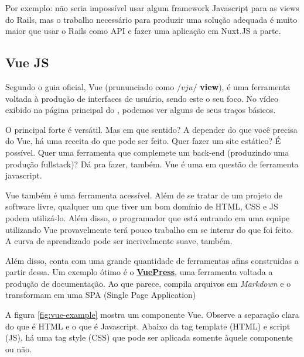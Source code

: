 Por exemplo: não seria impossível usar algum framework Javascript para as views do Rails, mas
o trabalho necessário para produzir uma solução adequada é muito maior que usar o Rails como
API e fazer uma aplicação em Nuxt.JS a parte.

\subsection{Vue JS}\label{subsec:vue-js}

Segundo o guia oficial, Vue (prununciado como $/vju/$ \dir \textbf{view}), é uma ferramenta
voltada à produção de interfaces de usuário, sendo este o seu foco. No vídeo exibido na página
principal do , podemos ver alguns de seus traços básicos.

O principal forte é versátil. Mas em que sentido? A depender do que você precisa do Vue, há uma
receita do que pode ser feito. Quer fazer um site estático? É possível. Quer uma ferramenta que
complemete um back-end (produzindo uma produção fullstack)? Dá pra fazer, também. Vue é uma
 em questão de ferramenta javascript.

Vue também é uma ferramenta acessível. Além de se tratar de um projeto de software livre, qualquer
um que tiver um bom domínio de HTML, CSS e JS podem utilizá-lo. Além disso, o programador que está
entrando em uma equipe utilizando Vue provavelmente terá pouco trabalho em se interar do que foi
feito. A curva de aprendizado pode ser incrivelmente suave, também.

Além disso, conta com uma grande quantidade de ferramentas afins construidas a partir dessa. Um
exemplo ótimo é o \href{https://www.youtube.com/watch?v=lIv1ItUzktc}{\textbf{VuePress}}, uma
ferramenta voltada a produção de documentação. Ao que parece, compila arquivos em \emph{Markdown}
e o transformam em uma SPA (Single Page Application)

A figura \ref{fig:vue-example} mostra um componente Vue. Observe a separação clara do que é HTML e
o que é Javascript. Abaixo da tag template (HTML) e script (JS), há uma tag style (CSS) que pode ser
aplicada somente àquele componente ou não.

